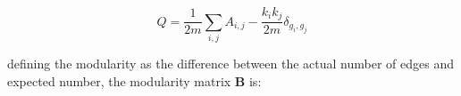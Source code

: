 \begin{equation}
    Q = \frac{1}{2m} \sum_{i,j} A_{i,j} - \frac{k_i k_j}{2m} \delta_{g_i,g_j}
    \label{eq: modularity A-kk delta group}
\end{equation}












defining the modularity as the difference between the actual number of edges and expected number, the modularity matrix $\mathbf{B}$ is:

